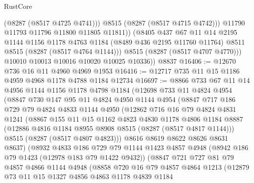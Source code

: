 \begin{lexlean}{RustCore}
\begin{coremodule}
                  (@8287 (@8517 @4725 @4741)))
                @8515
                (@8287 (@8517 @4715 @4742)))
              @11790
              @11793
              @11796
              @11800
              @11805
              @11811))
          (@8405
            @437
            @67
            @11
            @14
            @2195
            @1144
            @1156
            @1178
            @4763
            @1184
            (@8489 @436 @2195 @11760 @11764)
            @8511
            @8515
            (@8287 (@8517 @4764 @1144)))
          @8515
          (@8287 (@8517 @4707 @4770)))
        @10010
        @10013
        @10016
        @10020
        @10025
        @10336))
    @8837
@16406 := @12670 @736 @16 @11 @4960 @4969 @1953
@16416 := @12717 @735 @11 @15 @1186 @4959 @4968 @1178 @4788 @1184 @12734
@16697 := @8866
    @733
    @67
    @11
    @14
    @4956
    @1144
    @1156
    @1178
    @4798
    @1184
    (@12698
      @733
      @11
      @4824
      @4954
      (@8847
        @730
        @147
        @95
        @11
        @4824
        @4950
        @1144
        @4954
        (@8847
          @717
          @186
          @729
          @79
          @4824
          @4833
          @1144
          @4950
          (@12862
            @716
            @16
            @79
            @4824
            @4831
            @1241
            (@8867
              @155
              @11
              @15
              @1162
              @4823
              @4830
              @1178
              @4806
              @1184
              @8887
              (@12886 @4816 @1184 @8955 @8908 @8515 (@8287 (@8517 @4817 @1144)))
              @8515
              (@8287 (@8517 @4807 @4823)))
            @8616
            @8619
            @8622
            @8626
            @8631
            @8637)
          (@8932
            @4833
            @186
            @729
            @79
            @1144
            @1423
            @4857
            @4948
            (@8942 @186 @79 @1423 (@12978 @183 @79 @1422 @9432))
            (@8847
              @721
              @727
              @81
              @79
              @4857
              @4866
              @1144
              @4948
              (@8858
                @720
                @16
                @79
                @4857
                @4864
                @1213
                (@12879
                  @73
                  @11
                  @15
                  @1327
                  @4856
                  @4863
                  @1178
                  @4839
                  @1184

\end{coremodule}
\end{lexlean}
